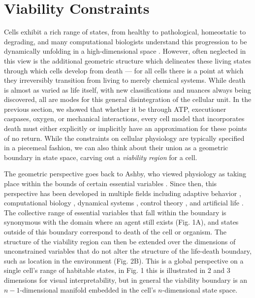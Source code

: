 \documentclass{article}
\begin{document}
\section{Viability Constraints}

Cells exhibit a rich range of states, from healthy to pathological, homeostatic to degrading, and many computational biologists understand this progression to be dynamically unfolding in a high-dimensional space \cite{lange_cellrank_2022}. However, often neglected in this view is the additional geometric structure which delineates these living states through which cells develop from death — for all cells there is a point at which they irreversibly transition from living to merely chemical systems. While death is almost as varied as life itself, with new classifications and nuances always being discovered, all are modes for this general disintegration of the cellular unit. In the previous section, we showed that whether it be through ATP, executioner caspases, oxygen, or mechanical interactions, every cell model that incorporates death must either explicitly or implicitly have an approximation for these points of no return. While the constraints on cellular physiology are typically specified in a piecemeal fashion, we can also think about their union as a geometric boundary in state space, carving out a \textit{viability region} for a cell. 

The geometric perspective goes back to Ashby, who viewed physiology as taking place within the bounds of certain essential variables \cite{ashby_design_1960}. Since then, this perspective has been developed in multiple fields including adaptive behavior \cite{beer_dynamical_1995}, computational biology \cite{voit_systems-theoretical_2009,davis_dynamical_2019}, dynamical systems \cite{mcshaffrey_decomposing_2023}, control theory \cite{aubin_viability_2011}, and artificial life \cite{barandiaran_norm-establishing_2014}. The collective range of essential variables that fall within the boundary is synonymous with the domain where an agent still exists (Fig. 1A), and states outside of this boundary correspond to death of the cell or organism. The structure of the viability region can then be extended over the dimensions of unconstrained variables that do not alter the structure of the life-death boundary, such as location in the environment (Fig. 2B). This is a global perspective on a single cell’s range of habitable states, in Fig. 1 this is illustrated in 2 and 3 dimensions for visual interpretability, but in general the viability boundary is an \(n-1\)-dimensional manifold embedded in the cell’s \(n\)-dimensional state space.  
\end{document}

